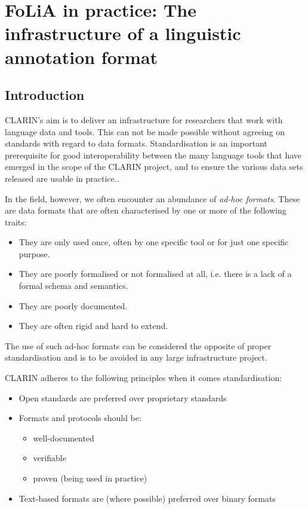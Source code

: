 \chapter{FoLiA in practice: The infrastructure of a linguistic annotation format}

\section{Introduction}

CLARIN's aim is to deliver an infrastructure for researchers that work with
language data and tools. This can not be made possible without agreeing on standards
with regard to data formats. Standardisation is an important prerequisite for
good interoperability between the many language tools that have emerged in the scope
of the CLARIN project, and to ensure the various data sets released are usable
in practice..

In the field, however, we often encounter an abundance of \emph{ad-hoc formats}. These are
data formats that are often characterised by one or more of the following traits:

\begin{itemize}
    \item They are only used once, often by one specific tool or for just one specific purpose.
    \item They are poorly formalised or not formalised at all, i.e. there is a lack of a formal schema and semantics.
    \item They are poorly documented.
    \item They are often rigid and hard to extend.
\end{itemize}

The use of such ad-hoc formats can be considered the opposite of proper
standardisation and is to be avoided in any large infrastructure project. 

CLARIN adheres to the following principles when it comes standardisation:

\begin{itemize}
    \item Open standards are preferred over proprietary standards
    \item Formats and protocols should be:
    \begin{itemize}
        \item well-documented
        \item verifiable
        \item proven (being used in practice)
    \end{itemize}
    \item Text-based formats are (where possible) preferred over binary formats
\end{itemize}

